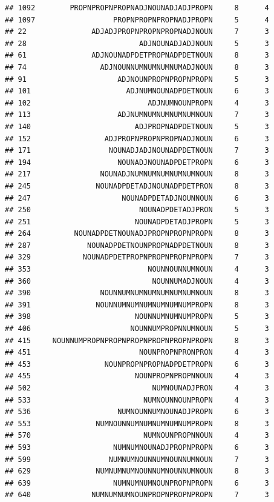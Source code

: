 \documentclass[]{article}
\begin{document}
\begin{verbatim}
## 1092        PROPNPROPNPROPNADJNOUNADJADJPROPN     8      4
## 1097                  PROPNPROPNPROPNADJPROPN     5      4
## 22               ADJADJPROPNPROPNPROPNADJNOUN     7      3
## 28                          ADJNOUNADJADJNOUN     5      3
## 61               ADJNOUNADPDETPROPNADPDETNOUN     8      3
## 74                 ADJNOUNNUMNUMNUMNUMADJNOUN     8      3
## 91                     ADJNOUNPROPNPROPNPROPN     5      3
## 101                      ADJNUMNOUNADPDETNOUN     6      3
## 102                           ADJNUMNOUNPROPN     4      3
## 113                    ADJNUMNUMNUMNUMNUMNOUN     7      3
## 140                        ADJPROPNADPDETNOUN     5      3
## 152                 ADJPROPNPROPNPROPNADJNOUN     6      3
## 171                  NOUNADJADJNOUNADPDETNOUN     7      3
## 194                    NOUNADJNOUNADPDETPROPN     6      3
## 217                NOUNADJNUMNUMNUMNUMNUMNOUN     8      3
## 245               NOUNADPDETADJNOUNADPDETPRON     8      3
## 247                     NOUNADPDETADJNOUNNOUN     6      3
## 250                         NOUNADPDETADJPRON     5      3
## 251                        NOUNADPDETADJPROPN     5      3
## 264          NOUNADPDETNOUNADJPROPNPROPNPROPN     8      3
## 287             NOUNADPDETNOUNPROPNADPDETNOUN     8      3
## 329            NOUNADPDETPROPNPROPNPROPNPROPN     7      3
## 353                           NOUNNOUNNUMNOUN     4      3
## 360                            NOUNNUMADJNOUN     4      3
## 390                NOUNNUMNUMNUMNUMNUMNUMNOUN     8      3
## 391               NOUNNUMNUMNUMNUMNUMNUMPROPN     8      3
## 398                        NOUNNUMNUMNUMPROPN     5      3
## 406                       NOUNNUMPROPNNUMNOUN     5      3
## 415     NOUNNUMPROPNPROPNPROPNPROPNPROPNPROPN     8      3
## 451                         NOUNPROPNPRONPRON     4      3
## 453                 NOUNPROPNPROPNADPDETPROPN     6      3
## 455                        NOUNPROPNPROPNNOUN     4      3
## 502                            NUMNOUNADJPRON     4      3
## 533                          NUMNOUNNOUNPROPN     4      3
## 536                    NUMNOUNNUMNOUNADJPROPN     6      3
## 553               NUMNOUNNUMNUMNUMNUMNUMPROPN     8      3
## 570                          NUMNOUNPROPNNOUN     4      3
## 593                   NUMNUMNOUNADJPROPNPROPN     6      3
## 599                  NUMNUMNOUNNUMNOUNNUMNOUN     7      3
## 629               NUMNUMNUMNOUNNUMNOUNNUMNOUN     8      3
## 639                   NUMNUMNUMNOUNPROPNPROPN     6      3
## 640              NUMNUMNUMNOUNPROPNPROPNPROPN     7      3

\end{verbatim}
\end{document}
